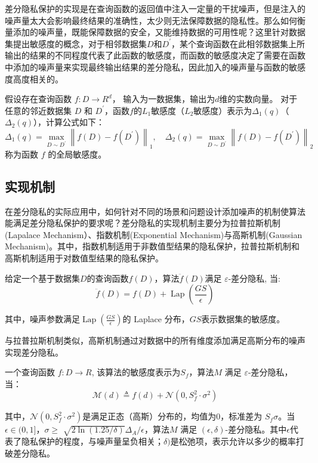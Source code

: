差分隐私保护的实现是在查询函数的返回值中注入一定量的干扰噪声，但是注入的噪声量太大会影响最终结果的准确性，太少则无法保障数据的隐私性。那么如何衡量添加的噪声量，既能保障数据的安全，又能维持数据的可用性呢？这里针对数据集提出敏感度的概念，对于相邻数据集$D$和$D^{\prime}$，某个查询函数在此相邻数据集上所输出的结果的不同程度代表了此函数的敏感度，而函数的敏感度决定了需要在函数中添加的噪声量来实现最终输出结果的差分隐私，因此加入的噪声量与函数的敏感度高度相关的。

\begin{define}[函数敏感度]\label{函数敏感度}
假设存在查询函数 $f: D \rightarrow R^{d}$， 输入为一数据集，输出为$d$维的实数向量。 对于任意的邻近数据集 $D$ 和 $D^{\prime}$，函数$f$的$L_{1}$敏感度（$L_{2}$敏感度）表示为$\Delta_{1}(q)$（$\Delta_{2}(q)$），计算公式如下：
$$
\Delta_{1}(q)=\max _{D \sim D^{\prime}}\left\|f(D)-f\left(D^{\prime}\right)\right\|_{1}, \quad \Delta_{2}(q)=\max _{D \sim D^{\prime}}\left\|f(D)-f\left(D^{\prime}\right)\right\|_{2}
$$
称为函数 $f$ 的全局敏感度。
\end{define}

\subsection{实现机制}
在差分隐私的实际应用中，如何针对不同的场景和问题设计添加噪声的机制使算法能满足差分隐私保护的要求呢？差分隐私的实现机制主要分为拉普拉斯机制(Lapalace Mechanism）、指数机制(Exponential Mechanism)与高斯机制(Gaussian Mechanism)。其中，指数机制适用于非数值型结果的隐私保护，拉普拉斯机制和高斯机制适用于对数值型结果的隐私保护。

\begin{theorem}[拉普拉斯机制]\label{拉普拉斯机制}
给定一个基于数据集$D$的查询函数$f(D)$，算法$\ddot{f}(D)$满足 $\varepsilon$-差分隐私, 当:
$$
\ddot{f}(D)=f(D)+\operatorname{Lap}\left(\frac{G S}{\epsilon}\right)
$$
\end{theorem}
其中，噪声参数满足$\operatorname{Lap}\left(\frac{G S}{\epsilon}\right)$的 Laplace 分布，$GS$表示数据集的敏感度。

与拉普拉斯机制类似，高斯机制通过对数据中的所有维度添加满足高斯分布的噪声实现差分隐私。
\begin{theorem}[高斯机制]\label{高斯机制}
一个查询函数 $f: D \rightarrow R$, 该算法的敏感度表示为$S_{f}$，算法$M$ 满足 $\varepsilon$-差分隐私，当：
$$
\mathcal{M}(d) \triangleq f(d)+\mathcal{N}\left(0, S_{f}^{2} \cdot \sigma^{2}\right)
$$
\end{theorem}
其中，$\mathcal{N}\left(0, S_{f}^{2} \cdot \sigma^{2}\right)$是满足正态（高斯）分布的，均值为0，标准差为 $S_{f} \sigma$。当$\epsilon \in(0,1]$，$\sigma \geq$ $\sqrt{2 \ln (1.25 / \delta)} \Delta_{A} / \epsilon$，算法$M$ 满足 $(\epsilon, \delta)$-差分隐私。其中$\epsilon$代表了隐私保护的程度，与噪声量呈负相关；$\delta)$是松弛项，表示允许以多少的概率打破差分隐私。

